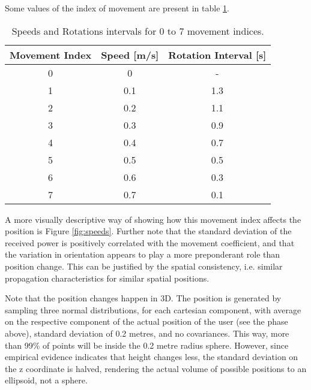 Some values of the index of movement are present in table \ref{tab:head_speeds}.

\begin{table}[htp]
    \centering
    \caption{Speeds and Rotations intervals for 0 to 7 movement indices.}
    \label{tab:head_speeds}
    \begin{tabular}{|c|c|c|}
    \hline
    Movement Index & Speed {[}m/s{]} & Rotation Interval {[}s{]} \\ \hline
    0              & 0               & -                         \\ \hline
    1              & 0.1             & 1.3                       \\ \hline
    2              & 0.2             & 1.1                       \\ \hline
    3              & 0.3             & 0.9                       \\ \hline
    4              & 0.4             & 0.7                       \\ \hline
    5              & 0.5             & 0.5                       \\ \hline
    6              & 0.6             & 0.3                       \\ \hline
    7              & 0.7             & 0.1                       \\ \hline
    \end{tabular}
\end{table}


A more visually descriptive way of showing how this movement index affects the position is Figure \ref{fig:speeds}. Further note that the standard deviation of the received power is positively correlated with the movement coefficient, and that the variation in orientation appears to play a more preponderant role than position change. This can be justified by the spatial consistency, i.e. similar propagation characteristics for similar spatial positions.


Note that the position changes happen in 3D. The position is generated by sampling three normal distributions, for each cartesian component, with average on the respective component of the actual position of the user (see the phase above), standard deviation of 0.2 metres, and no covariances. This way, more than 99\% of points will be inside the 0.2 metre radius sphere. However, since empirical evidence indicates that height changes less, the standard deviation on the z coordinate is halved, rendering the actual volume of possible positions to an ellipsoid, not a sphere.



